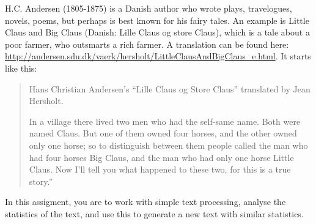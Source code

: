 H.C. Andersen (1805-1875) is a Danish author who wrote plays, travelogues, novels, poems, but perhaps is best known for his fairy tales. An example is Little Claus and Big Claus (Danish: Lille Claus og store Claus), which is a tale about a poor farmer, who outsmarts a rich farmer. A translation can be found here: \url{http://andersen.sdu.dk/vaerk/hersholt/LittleClausAndBigClaus_e.html}. It starts like this:
\begin{quote}
  Hans Christian Andersen's ``Lille Claus og Store Claus'' translated by Jean Hersholt.

In a village there lived two men who had the self-same name. Both were named Claus. But one of them owned four horses, and the other owned only one horse; so to distinguish between them people called the man who had four horses Big Claus, and the man who had only one horse Little Claus. Now I'll tell you what happened to these two, for this is a true story.''
\end{quote}

In this assigment, you are to work with simple text processing, analyse the statistics of the text, and use this to generate a new text with similar statistics.